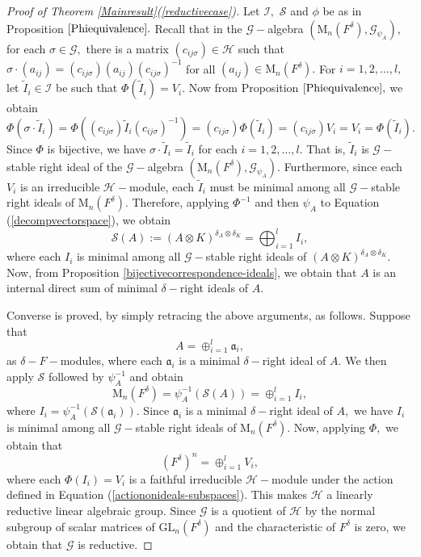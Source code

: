 \documentclass[preprint, 11pt]{amsart}
\theoremstyle{corollary}
\theoremstyle{remark}
\theoremstyle{proposition}
\numberwithin{equation}{subsection}
\begin{document}
\begin{proof}[Proof of Theorem \ref{Mainresult}(\ref{reductivecase})]
Let  $\mathcal I,$ $\mathcal S$ and $\phi$ be as in Proposition $\ref{Phiequivalence}.$   Recall that in the $\mathscr G-$algebra $(\mathrm{M}_n(F^\delta), \mathscr G_{\psi_A}),$ for each $\sigma\in \mathscr G,$ there is a matrix $(c_{ij\sigma})\in \mathscr H$ such that $\sigma \cdot (a_{ij})=(c_{ij\sigma})(a_{ij})(c_{ij\sigma})^{-1}$ for all $(a_{ij})\in \mathrm{M}_n(F^\delta).$ For $i=1,2,\dots, l,$ let $\tilde{I}_i\in \mathcal I$ be such that $\Phi(\tilde{I}_i)=V_i.$  Now from Proposition $\ref{Phiequivalence},$ we obtain $$\Phi\left(\sigma\cdot\tilde{I}_i\right)=\Phi\left((c_{ij\sigma})\tilde{I}_i(c_{ij\sigma})^{-1}\right)=(c_{ij\sigma}) \Phi(\tilde{I}_i)=(c_{ij\sigma})V_i=V_i=\Phi(\tilde{I}_i).$$
Since $\Phi$ is bijective, we have $\sigma\cdot \tilde{I}_i=\tilde{I}_i$ for each $i=1,2,\dots, l.$ That is, $\tilde{I}_i$ is  $\mathscr G-$stable right ideal of the $\mathscr G-$algebra $(\mathrm{M}_n(F^\delta), \mathscr G_{\psi_A})$. Furthermore,  since each $V_i$ is an  irreducible $\mathscr H-$module, each $\tilde{I}_i$ must be minimal among all $\mathscr G-$stable right ideals of $\mathrm{M}_n(F^\delta).$  Therefore,  applying $\Phi^{-1}$ and then $\psi_A$ to Equation (\ref{decompvectorspace}), we obtain  \begin{equation}\label{tensordescent}\mathscr S(A):=(A\otimes K)^{\delta_A\otimes \delta_K}=\bigoplus^l_{i=1}I_i,\end{equation}   
	where each $I_i$ is minimal among all $\mathscr G-$stable right ideals of $(A\otimes K)^{\delta_A\otimes \delta_K}.$   Now, from Proposition \ref{bijectivecorrespondence-ideals},  we obtain that $A$ is  an internal direct sum of minimal $\delta-$right ideals of $A.$
	
	Converse is proved, by simply retracing the above arguments, as follows.  Suppose that $$A= \oplus^l_{i=1}\mathfrak a_i,$$ as $\delta-F-$modules, where each $\mathfrak{a}_i$ is a minimal $\delta-$right ideal of $A.$ We then apply $\mathscr S$ followed by $\psi^{-1}_A$ and obtain $$\mathrm{M}_n(F^{\delta})=  \psi^{-1}_A(\mathscr S(A))= \oplus^l_{i=1}I_i,$$ where 
	$I_i=\psi^{-1}_A(\mathscr S(\mathfrak a_i)).$ Since $\mathfrak{a}_i$ is a minimal $\delta-$right ideal of $A,$ we have $I_i$ is  minimal among all $\mathscr{G}-$stable right ideals of  $\mathrm{M}_n(F^{\delta}).$ Now, 
	applying $\Phi,$ we obtain that $$(F^{\delta})^n=\oplus^l_{i=1}V_i,$$  where each $\Phi(I_i)=V_i$ is a faithful irreducible $\mathscr H-$module under the action defined in Equation (\ref{actiononideals-subspaces}). This makes $\mathscr H$ a linearly reductive linear algebraic group. Since   $\mathscr G$ is a quotient of $\mathscr H$ by the normal subgroup of scalar matrices of $\mathrm{GL}_n(F^{\delta})$ and the characteristic of $F^{\delta}$ is zero,  we obtain that $\mathscr G$ is reductive. \end{proof}
	
\end{document}

